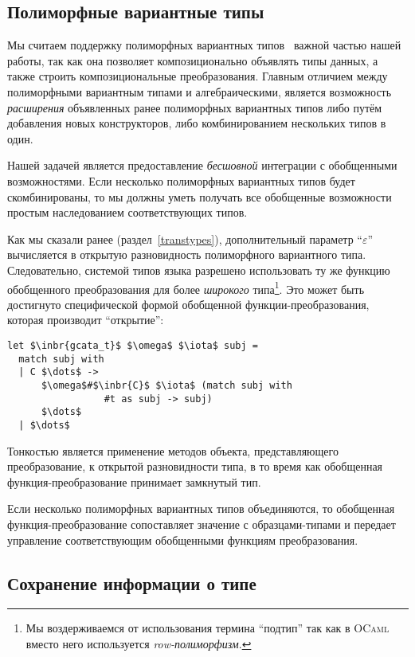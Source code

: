 \subsection{Полиморфные вариантные типы}
\label{pv}

Мы считаем поддержку полиморфных вариантных типов~\cite{PolyVar,PolyVarReuse} важной частью нашей работы, так как она позволяет 
композиционально объявлять типы данных, а также строить композициональные преобразования.
Главным отличием между полиморфными вариантным типами и алгебраическими, является возможность
\emph{расширения} объявленных ранее полиморфных вариантных типов либо путём добавления новых конструкторов, либо комбинированием нескольких типов в один.

Нашей задачей является предоставление  \emph{бесшовной} интеграции с обобщенными возможностями. Если несколько полиморфных вариантных типов будет скомбинированы, то мы должны уметь получать все обобщенные возможности простым наследованием соответствующих типов.

Как мы сказали ранее (раздел~\ref{transtypes}), дополнительный параметр  ``$\varepsilon$'' вычисляется в открытую разновидность полиморфного вариантного типа. Следовательно, системой типов языка \OCaml{} разрешено использовать ту же функцию обобщенного преобразования для более \emph{широкого} типа\footnote{Мы воздерживаемся от использования термина ``подтип'' так как в \textsc{OCaml} вместо него используется \emph{row-полиморфизм}.}. 
Это может быть достигнуто специфической формой обобщенной функции-преобразования, которая производит ``открытие'':

\begin{lstlisting}
let $\inbr{gcata_t}$ $\omega$ $\iota$ subj =
  match subj with
  | C $\dots$ -> 
      $\omega$#$\inbr{C}$ $\iota$ (match subj with 
                 #t as subj -> subj) 
      $\dots$
  | $\dots$
\end{lstlisting}

Тонкостью является применение методов объекта, представляющего преобразование, к открытой разновидности типа, в то время как обобщенная функция-преобразование принимает замкнутый тип.

Если несколько полиморфных вариантных типов объединяются, то обобщенная функция-преобразование сопоставляет значение с образцами-типами и передает управление соответствующим обобщенными функциям преобразования.

\subsection{Сохранение информации о типе}
\label{typeinfo}

